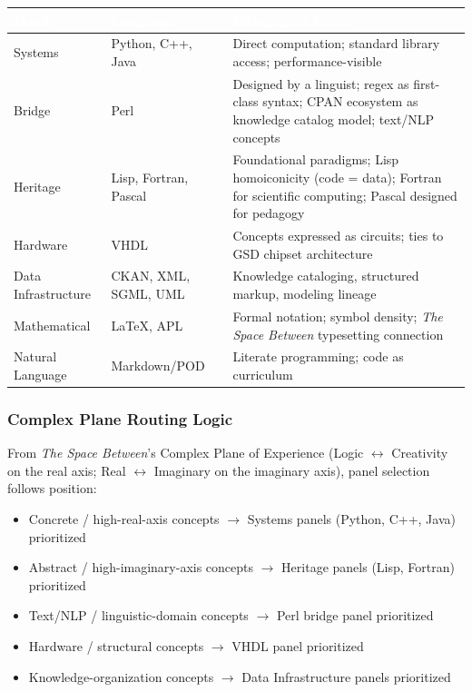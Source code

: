 \documentclass[11pt,letterpaper]{article}
\newcommand{\tableheader}[1]{\textbf{\sffamily\textcolor{white}{#1}}}
\begin{document}
\begin{center}
\begin{tabularx}{\textwidth}{L{2.8cm}L{2.2cm}X}
\toprule
{}
\tableheader{Family} & \tableheader{Languages} & \tableheader{Pedagogical Focus} \\
\midrule
Systems & Python, C++, Java & Direct computation; standard library access; performance-visible \\
Bridge & Perl & Designed by a linguist; regex as first-class syntax; CPAN ecosystem as knowledge catalog model; text/NLP concepts \\
Heritage & Lisp, Fortran, Pascal & Foundational paradigms; Lisp homoiconicity (code = data); Fortran for scientific computing; Pascal designed for pedagogy \\
Hardware & VHDL & Concepts expressed as circuits; ties to GSD chipset architecture \\
Data Infrastructure & CKAN, XML, SGML, UML & Knowledge cataloging, structured markup, modeling lineage \\
Mathematical & LaTeX, APL & Formal notation; symbol density; \textit{The Space Between} typesetting connection \\
Natural Language & Markdown/POD & Literate programming; code as curriculum \\
\bottomrule
\end{tabularx}
\end{center}

\subsubsection{Complex Plane Routing Logic}

From \textit{The Space Between}'s Complex Plane of Experience (Logic $\leftrightarrow$ Creativity on the real axis; Real $\leftrightarrow$ Imaginary on the imaginary axis), panel selection follows position:

\begin{itemize}[leftmargin=1.5em]
  \item Concrete / high-real-axis concepts $\rightarrow$ Systems panels (Python, C++, Java) prioritized
  \item Abstract / high-imaginary-axis concepts $\rightarrow$ Heritage panels (Lisp, Fortran) prioritized
  \item Text/NLP / linguistic-domain concepts $\rightarrow$ Perl bridge panel prioritized
  \item Hardware / structural concepts $\rightarrow$ VHDL panel prioritized
  \item Knowledge-organization concepts $\rightarrow$ Data Infrastructure panels prioritized
\end{itemize}
\end{document}
